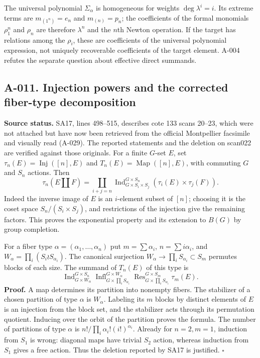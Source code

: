 The universal polynomial $\Sigma_\alpha$ is homogeneous for weights
$\deg\lambda^i=i$. Its extreme terms are $m_{(1^n)}=e_n$ and
$m_{(n)}=p_n$; the coefficients of the formal monomials $\rho_1^n$
and $\rho_n$ are therefore $\lambda^n$ and the $n$th Newton operation.
If the target has relations among the $\rho_i$, these are coefficients
of the universal polynomial expression, not uniquely recoverable
coefficients of the target element. A-004 refutes the separate question
about effective direct summands.

\subsection*{A-011. Injection powers and the corrected fiber-type decomposition}
\textbf{Source status.} SA17, lines 498--515, describes cote 133 scans
20--23, which were not attached but have now been retrieved from the
official Montpellier facsimile and visually read (A-029). The
reported statements and the deletion on scan022 are verified against
those originals. For a finite $G$-set $E$, set
$\tau_n(E)=\operatorname{Inj}([n],E)$ and
$T_n(E)=\operatorname{Map}([n],E)$, with commuting $G$ and $S_n$ actions.
Then
\[
 \tau_n(E\amalg F)=\coprod_{i+j=n}
 \operatorname{Ind}_{G\times S_i\times S_j}^{G\times S_n}
       (\tau_i(E)\times\tau_j(F)).
\]
Indeed the inverse image of $E$ is an $i$-element subset of $[n]$;
choosing it is the coset space $S_n/(S_i\times S_j)$, and restrictions
of the injection give the remaining factors. This proves the
exponential property and its extension to $B(G)$ by group completion.

For a fiber type $\alpha=(\alpha_1,\ldots,\alpha_n)$ put
$m=\sum\alpha_i$, $n=\sum i\alpha_i$, and
$W_\alpha=\prod_i(S_i\wr S_{\alpha_i})$. The canonical surjection
$W_\alpha\to\prod_iS_{\alpha_i}\subset S_m$ permutes blocks of
each size. The summand of $T_n(E)$ of this type is
\[
 \operatorname{Ind}_{G\times W_\alpha}^{G\times S_n}
 \operatorname{Infl}_{G\times\prod_iS_{\alpha_i}}^{G\times W_\alpha}
 \operatorname{Res}_{G\times\prod_iS_{\alpha_i}}^{G\times S_m}
 \tau_m(E).
\]
\textbf{Proof.} A map determines its partition into nonempty fibers.
The stabilizer of a chosen partition of type $\alpha$ is $W_\alpha$.
Labeling its $m$ blocks by distinct elements of $E$ is an injection
from the block set, and the stabilizer acts through its permutation
quotient. Inducing over the orbit of the partition proves the formula.
The number of partitions of type $\alpha$ is
$n!/\prod_i\alpha_i!(i!)^{\alpha_i}$. Already for $n=2,m=1$,
induction from $S_1$ is wrong: diagonal maps have trivial $S_2$ action,
whereas induction from $S_1$ gives a free action. Thus the deletion
reported by SA17 is justified. \hfill$\square$

